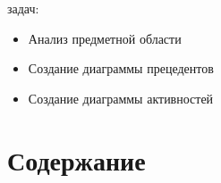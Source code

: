 \documentclass[14pt]{extreport}
\begin{document}
 задач:
\begin{itemize}
    \item Анализ предметной области 
    \item Создание диаграммы прецедентов
    \item Создание диаграммы активностей
\end{itemize}


\chapter{Содержание}

\conclusions

\begin{thebibliography}{2}

\end{thebibliography}
\end{document}
